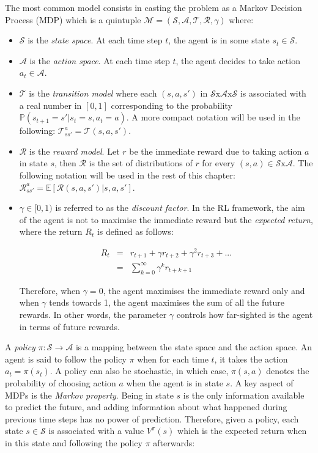 			The most common model consists in casting the problem as a Markov Decision Process (MDP) which is a quintuple $\mathcal{M} = (\mathcal{S},\mathcal{A},\mathscr{T},\mathscr{R},\gamma)$ where:
			\begin{itemize}
					\item $\mathcal{S}$ is the \textit{state space}. At each time step $t$, the agent is in some state $s_t \in \mathcal{S}$.
					\item $\mathcal{A}$ is the \textit{action space}. At each time step $t$, the agent decides to take action $a_t \in \mathcal{A}$.
					\item $\mathscr{T}$ is the \textit{transition model} where each $(s,a,s')$ in $\mathcal{S} \text{x} \mathcal{A} \text{x} \mathcal{S}$ is associated with a real number in $[0,1]$ corresponding to the probability $\mathbb{P} (s_{t+1} = s'|s_t = s, a_t=a)$. A more compact notation will be used in the following: $\mathscr{T}_{ss'}^a = \mathscr{T} (s,a,s')$.
					\item $\mathscr{R}$ is the \textit{reward model}. Let $r$ be the immediate reward due to taking action $a$ in state $s$, then $\mathscr{R}$ is the set of distributions of $r$ for every $(s,a) \in \mathcal{S} \text{x} \mathcal{A}$. The following notation will be used in the rest of this chapter: $\mathscr{R}_{ss'}^a = \mathbb{E} [\mathscr{R} (s,a,s')|s,a,s']$.
					\item $\gamma \in [0,1)$ is referred to as the \textit{discount factor}. In the RL framework, the aim of the agent is not to maximise the immediate reward but the \textit{expected return}, where the return $R_t$ is defined as follows:
					
					\begin{eqnarray}
						R_t & = & r_{t+1} + \gamma r_{t+2} + \gamma^2 r_{t+3} + ... \nonumber \\
						& = & \sum_{k=0}^\infty \gamma^k r_{t+k+1} \label{eq:return}
					\end{eqnarray}
					
					Therefore, when $\gamma = 0$, the agent maximises the immediate reward only and when $\gamma$ tends towards 1, the agent maximises the sum of all the future rewards. In other words, the parameter $\gamma$ controls how far-sighted is the agent in terms of future rewards.
	\end{itemize}
			
			A \textit{policy} $\pi : \mathcal{S} \rightarrow \mathcal{A}$ is a mapping between the state space and the action space. An agent is said to follow the policy $\pi$ when for each time $t$, it takes the action $a_t = \pi(s_t)$. A policy can also be stochastic, in which case, $\pi (s,a)$ denotes the probability of choosing action $a$ when the agent is in state $s$. A key aspect of MDPs is the \textit{Markov property}. Being in state $s$ is the only information available to predict the future, and adding information about what happened during previous time steps has no power of prediction. Therefore, given a policy, each state $s \in \mathcal{S}$ is associated with a value $V^\pi (s)$ which is the expected return when in this state and following the policy $\pi$ afterwards:
				
